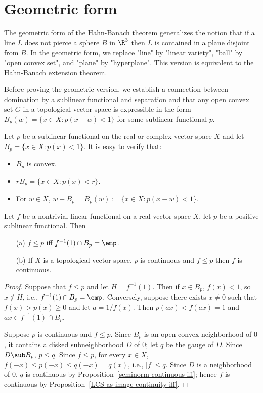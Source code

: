 \section{Geometric form}
The geometric form of the Hahn-Banach theorem generalizes the notion that if a line $L$ does not pierce a sphere $B$ in $\R^3$ then $L$ is contained in a plane disjoint from $B$. In the geometric form, we replace "line" by "linear variety", "ball" by "open convex set", and "plane" by "hyperplane". This version is equivalent to the Hahn-Banach extension theorem.\par
Before proving the geometric version, we establish a connection between domination by a sublinear functional and separation and that any open convex set $G$ in a topological vector space is expressible in the form $B_p(w)=\{x\in X:p(x-w)<1\}$ for some sublinear functional $p$.\par
Let $p$ be a sublinear functional on the real or complex vector space $X$ and let $B_p=\{x\in X:p(x)<1\}$. It is easy to verify that:
\begin{itemize}
\item $B_p$ is convex.
\item $rB_p=\{x\in X:p(x)<r\}$.
\item For $w\in X$, $w+B_p=B_p(w):=\{x\in X:p(x-w)<1\}$.
\end{itemize}
\begin{proposition}\label{sublinear functional domination prop}
Let $f$ be a nontrivial linear functional on a real vector space $X$, let $p$ be a positive sublinear functional. Then
\begin{itemize}
\item[(a)] $f\leq p$ iff $f^{-1}(1)\cap B_p=\emp$.
\item[(b)] If $X$ is a topological vector space, $p$ is continuous and $f\leq p$ then $f$ is continuous. 
\end{itemize}
\end{proposition}
\begin{proof}
Suppose that $f\leq p$ and let $H=f^{-1}(1)$. Then if $x\in B_p$, $f(x)<1$, so $x\notin H$, i.e., $f^{-1}(1)\cap B_p=\emp$. Conversely, suppose there exists $x\neq 0$ such that $f(x)>p(x)\geq 0$ and let $a=1/f(x)$. Then $p(ax)<f(ax)=1$ and $ax\in f^{-1}(1)\cap B_p$.\par
Suppose $p$ is continuous and $f\leq p$. Since $B_p$ is an open convex neighborhood of $0$, it contains a disked subneighborhood $D$ of $0$; let $q$ be the gauge of $D$. Since $D\sub B_p$, $p\leq q$. Since $f\leq p$, for every $x\in X$, $f(-x)\leq p(-x)\leq q(-x)=q(x)$, i.e., $|f|\leq q$. Since $D$ is a neighborhood of $0$, $q$ is continuous by Proposition~\ref{seminorm continuous iff}; hence $f$ is continuous by Proposition~\ref{LCS as image continuity iff}.
\end{proof}
